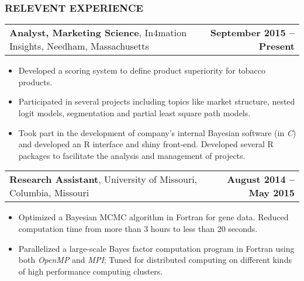 \documentclass[11pt]{article}
\makeatletter
\newcommand{\headerrow}[2]
{\begin{tabular*}{\linewidth}{l@{\extracolsep{\fill}}r}
	#1 & #2 \\
\end{tabular*}
}
\newcommand{\CPP}
{C\nolinebreak[4]\hspace{-.05em}\raisebox{.22ex}{\footnotesize\bf ++}}
\makeatother
\begin{document}
\subsubsection*{\centering RELEVENT EXPERIENCE}
\vspace{-.3em}

\headerrow
{\textbf{Analyst, Marketing Science}, In4mation Insights, Needham, Massachusetts}
{\textbf{September 2015 – Present}}
\begin{itemize}
    \item Developed a scoring system to define product superiority for tobacco products.
		\item Participated in several projects including topics like market structure, nested logit models, segmentation and partial least square path models.
    \item Took part in the development of company's internal Bayesian software (in \emph{\CPP}) and developed an R interface and shiny front-end. Developed several R packages to facilitate the analysis and management of projects.
\end{itemize}


\noindent\headerrow
{\textbf{Research Assistant}, University of Missouri, Columbia, Missouri}
{\textbf{August 2014 – May 2015}}
\begin{itemize}
	\item Optimized a Bayesian MCMC algorithm in Fortran for gene data. Reduced computation time from more than 3 hours to less than 20 seconds.
	\item Parallelized a large-scale Bayes factor computation program in Fortran using both \emph{OpenMP} and \emph{MPI}; Tuned for distributed computing on different kinds of high performance computing clusters.
\end{itemize}
\end{document}
